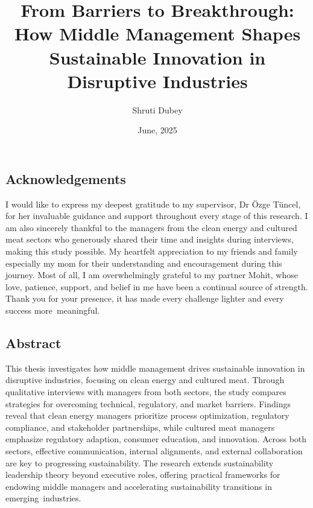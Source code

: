 \documentclass[12pt,a4paper]{article}
\title{From Barriers to Breakthrough: How Middle Management Shapes Sustainable Innovation in Disruptive Industries}
\author{Shruti Dubey}
\date{June, 2025}
\begin{document}
	
	\hypersetup{
		colorlinks=false,
		linkbordercolor=white,
		linkcolor=white,
		filecolor=white,      
		urlcolor=white,
		citecolor=white,
	}
	

	
	
\begin{center}
	\section*{Acknowledgements}
\end{center}
	I would like to express my deepest gratitude to my supervisor, Dr Özge Tüncel, for her invaluable guidance and support throughout every stage of this research. I am also sincerely thankful to the managers from the clean energy and cultured meat sectors who generously shared their time and insights during interviews, making this study possible. My heartfelt appreciation to my friends and family especially my mom for their understanding and encouragement during this journey. Most of all, I am overwhelmingly grateful to my partner Mohit, whose love, patience, support, and belief in me have been a continual source of strength. Thank you for your presence, it has made every challenge lighter and every success more meaningful.
	\newpage
\begin{center}
	\section*{Abstract}
\end{center}
		This thesis investigates how middle management drives sustainable innovation in disruptive industries, focusing on clean energy and cultured meat. Through qualitative interviews with managers from both sectors, the study compares strategies for overcoming technical, regulatory, and market barriers. Findings reveal that clean energy managers prioritize process optimization, regulatory compliance, and stakeholder partnerships, while cultured meat managers emphasize regulatory adaption, consumer education, and innovation. Across both sectors, effective communication, internal alignments, and external collaboration are key to progressing sustainability. The research extends sustainability leadership theory beyond executive roles, offering practical frameworks for endowing middle managers and accelerating sustainability transitions in emerging industries.

	\newpage
	\tableofcontents
	\newpage
	\listoftables
	\listoffigures
	\newpage
	
\end{document}
